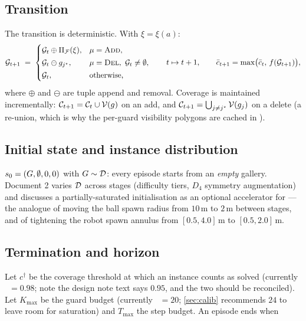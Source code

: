 \documentclass[11pt,a4paper]{article}
\begin{document}
\subsection{Transition}

The transition is deterministic. With $\xi = \xi(a)$:
\[
  \mathcal{G}_{t+1} \;=\;
  \begin{cases}
    \mathcal{G}_t \oplus \Pi_{\mathcal{F}}(\xi), & \mu = \textsc{Add}, \\[2pt]
    \mathcal{G}_t \ominus g_{j^\star}, & \mu = \textsc{Del},\ \mathcal{G}_t \neq \emptyset, \\[2pt]
    \mathcal{G}_t, & \text{otherwise,}
  \end{cases}
  \qquad
  t \mapsto t+1,
  \qquad
  \bar{c}_{t+1} = \max\bigl(\bar{c}_t,\, f(\mathcal{G}_{t+1})\bigr),
\]
where $\oplus$ and $\ominus$ are tuple append and removal. Coverage is maintained
incrementally: $\mathcal{C}_{t+1} = \mathcal{C}_t \cup \mathcal{V}(g)$ on an add, and
$\mathcal{C}_{t+1} = \bigcup_{j \ne j^\star}\mathcal{V}(g_j)$ on a delete (a re-union, which is why the
per-guard visibility polygons are cached in ).

\subsection{Initial state and instance distribution}

$s_0 = (G, \emptyset, 0, 0)$ with $G \sim \mathcal{D}$: every episode starts from
an \emph{empty} gallery. Document 2 varies $\mathcal{D}$ across stages (difficulty tiers,
$D_4$ symmetry augmentation) and discusses a partially-saturated initialisation as an
optional accelerator for \stageII{} --- the analogue of \citet{wang2025dribble} moving the
ball spawn radius from $10$\,m to $2$\,m between stages, and of \citet{xu2025striker}
tightening the robot spawn annulus from $[0.5,4.0]$\,m to $[0.5,2.0]$\,m.

\subsection{Termination and horizon}\label{sec:term}

Let $c^{\dagger}$ be the coverage threshold at which an instance counts as solved
(currently ~$= 0.98$; note the design note text says $0.95$, and
the two should be reconciled). Let $K_{\max}$ be the guard budget (currently
~$=20$; \cref{sec:calib} recommends $24$ to leave room for
saturation) and $T_{\max}$ the step budget. An episode ends when
\end{document}
